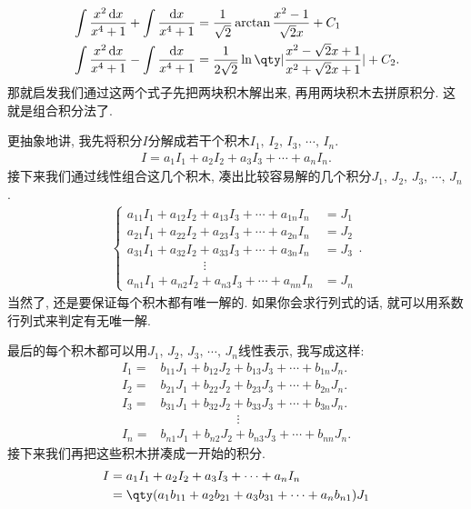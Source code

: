 \documentclass{ctexbook}
\newcommand*{\dif}{\mathop{}\!\mathrm{d}}
\begin{document}
{\begin{align*}
{}&\int\frac{x^{2}\dif{x}}{x^{4}+1}+\int\frac{\dif{x}}{x^{4}+1}=\frac{1}{\sqrt{2}}\arctan{\frac{x^{2}-1}{\sqrt{2}x}}+C_{1}\\
{}&\int\frac{x^{2}\dif{x}}{x^{4}+1}-\int\frac{\dif{x}}{x^{4}+1}=\frac{1}{2\sqrt{2}}\ln\qty|\frac{x^{2}-\sqrt{2}x+1}{x^{2}+\sqrt{2}x+1}|+C_{2}
.\end{align*}
那就启发我们通过这两个式子先把两块积木解出来, 再用两块积木去拼原积分. 这就是组合积分法了. \par
更抽象地讲, 我先将积分$I$分解成若干个积木$I_{1},\,I_{2},\,I_{3},\,\cdots,\,I_{n}$. 
\begin{align*}
I=a_{1}I_{1}+a_{2}I_{2}+a_{3}I_{3}+\cdots+a_{n}I_{n}
.\end{align*}
接下来我们通过线性组合这几个积木, 凑出比较容易解的几个积分$J_{1},\,J_{2},\,J_{3},\,\cdots,\,J_{n}$. 
\begin{align*}
\begin{cases}
a_{11}I_{1}+a_{12}I_{2}+a_{13}I_{3}+\cdots+a_{1n}I_{n}&=J_{1}\\
a_{21}I_{1}+a_{22}I_{2}+a_{23}I_{3}+\cdots+a_{2n}I_{n}&=J_{2}\\
a_{31}I_{1}+a_{32}I_{2}+a_{33}I_{3}+\cdots+a_{3n}I_{n}&=J_{3}\\
\qquad\qquad\qquad\vdots\\
a_{n1}I_{1}+a_{n2}I_{2}+a_{n3}I_{3}+\cdots+a_{nn}I_{n}&=J_{n}
\end{cases}
.\end{align*}
当然了, 还是要保证每个积木都有唯一解的. 如果你会求行列式的话, 就可以用系数行列式来判定有无唯一解. \par
最后的每个积木都可以用$J_{1},\,J_{2},\,J_{3},\,\cdots,\,J_{n}$线性表示, 我写成这样: 
\begin{align*}
I_{1}={}&b_{11}J_{1}+b_{12}J_{2}+b_{13}J_{3}+\cdots+b_{1n}J_{n}.\\
I_{2}={}&b_{21}J_{1}+b_{22}J_{2}+b_{23}J_{3}+\cdots+b_{2n}J_{n}.\\
I_{3}={}&b_{31}J_{1}+b_{32}J_{2}+b_{33}J_{3}+\cdots+b_{3n}J_{n}.\\
{}&\qquad\qquad\qquad\vdots\\
I_{n}={}&b_{n1}J_{1}+b_{n2}J_{2}+b_{n3}J_{3}+\cdots+b_{nn}J_{n}.
\end{align*}
接下来我们再把这些积木拼凑成一开始的积分. 
\begin{align*}
I={}&a_{1}I_{1}+a_{2}I_{2}+a_{3}I_{3}+\cdots+a_{n}I_{n}\\
={}&\qty(a_{1}b_{11}+a_{2}b_{21}+a_{3}b_{31}+\cdots+a_{n}b_{n1})J_{1}\\

\end{align*}}
\end{document}
